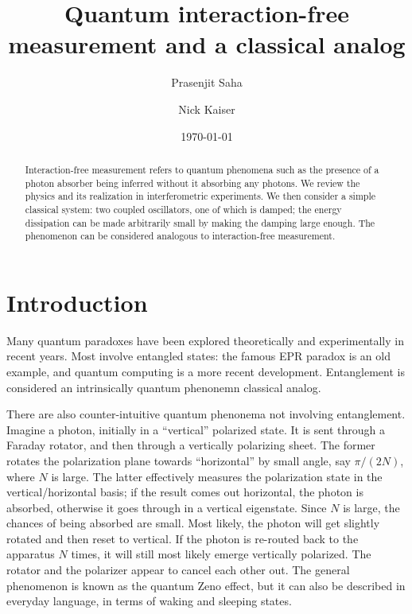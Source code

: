 \documentclass[12pt,aps,prb,preprint]{revtex4}
\begin{document}
\title{Quantum interaction-free measurement and a classical analog}

\author{Prasenjit Saha}
\author{Nick Kaiser}

\date{\today}

\begin{abstract}
Interaction-free measurement refers to quantum phenomena such as the
presence of a photon absorber being inferred without it absorbing any
photons.  We review the physics and its realization in interferometric
experiments.  We then consider a simple classical system: two coupled
oscillators, one of which is damped; the energy dissipation can be
made arbitrarily small by making the damping large enough.  The
phenomenon can be considered analogous to interaction-free
measurement.
\end{abstract}

\maketitle

\section{Introduction}

Many quantum paradoxes have been explored theoretically and
experimentally in recent years.  Most involve entangled states: the
famous EPR paradox is an old example, and quantum computing is a more
recent development\cite{2007qucosc.book}.  Entanglement is considered
an intrinsically quantum phenonemn classical analog.

There are also counter-intuitive quantum phenonema not involving
entanglement.  Imagine a photon, initially in a ``vertical'' polarized
state.  It is sent through a Faraday rotator, and then through a
vertically polarizing sheet.  The former rotates the polarization
plane towards ``horizontal'' by small angle, say $\pi/(2N)$, where $N$
is large.  The latter effectively measures the polarization state in
the vertical/horizontal basis; if the result comes out horizontal, the
photon is absorbed, otherwise it goes through in a vertical
eigenstate.  Since $N$ is large, the chances of being absorbed are
small.  Most likely, the photon will get slightly rotated and then
reset to vertical.  If the photon is re-routed back to the apparatus
$N$ times, it will still most likely emerge vertically polarized.  The
rotator and the polarizer appear to cancel each other out.  The
general phenomenon is known as the quantum Zeno
effect,\cite{PhysRevA.41.2295} but it can also be described in
everyday language, in terms of waking and sleeping
states.\cite{orzel2009teach}
\end{document}
